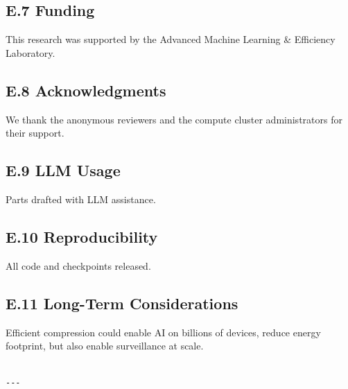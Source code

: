 \subsection{E.7 Funding}
This research was supported by the Advanced Machine Learning \& Efficiency Laboratory.

\subsection{E.8 Acknowledgments}
We thank the anonymous reviewers and the compute cluster administrators for their support.

\subsection{E.9 LLM Usage}
Parts drafted with LLM assistance.

\subsection{E.10 Reproducibility}
All code and checkpoints released.

\subsection{E.11 Long-Term Considerations}
Efficient compression could enable AI on billions of devices, reduce energy 
footprint, but also enable surveillance at scale.
\begin{lstlisting}

---
\end{lstlisting}